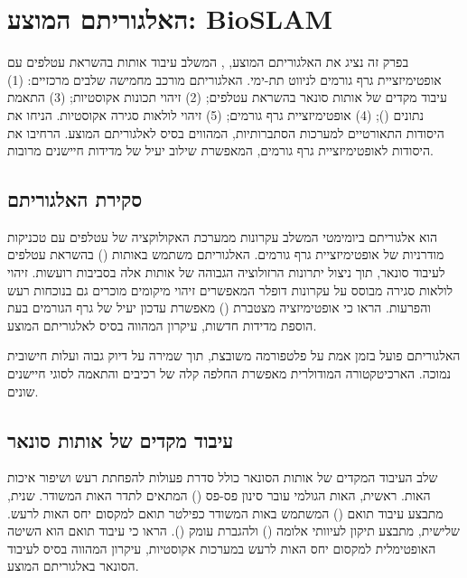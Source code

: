 
\section{האלגוריתם המוצע: BioSLAM}
\label{sec:proposed_algorithm}

בפרק זה נציג את האלגוריתם המוצע, , המשלב עיבוד אותות בהשראת עטלפים עם אופטימיזציית גרף גורמים לניווט תת-ימי. האלגוריתם מורכב מחמישה שלבים מרכזיים: (1) עיבוד מקדים של אותות סונאר בהשראת עטלפים; (2) זיהוי תכונות אקוסטיות; (3) התאמת נתונים (); (4) אופטימיזציית גרף גורמים; (5) זיהוי לולאות סגירה אקוסטיות. \citet{Thrun2005ProbRobotics} הניחו את היסודות התאורטיים למערכות  הסתברותיות, המהווים בסיס לאלגוריתם המוצע. \citet{Grisetti2010g2o} הרחיבו את היסודות לאופטימיזציית גרף גורמים, המאפשרת שילוב יעיל של מדידות חיישנים מרובות.

\subsection{סקירת האלגוריתם}
\label{sec:algorithm_overview}

 הוא אלגוריתם  ביומימטי המשלב עקרונות ממערכת האקולוקציה של עטלפים עם טכניקות מודרניות של אופטימיזציית גרף גורמים. האלגוריתם משתמש באותות  () בהשראת עטלפים לעיבוד סונאר, תוך ניצול יתרונות הרזולוציה הגבוהה של אותות אלה בסביבות רועשות. זיהוי לולאות סגירה מבוסס על עקרונות דופלר המאפשרים זיהוי מיקומים מוכרים גם בנוכחות רעש והפרעות. \citet{Kaess2012} הראו כי אופטימיזציה מצטברת () מאפשרת עדכון יעיל של גרף הגורמים בעת הוספת מדידות חדשות, עיקרון המהווה בסיס לאלגוריתם המוצע.

האלגוריתם פועל בזמן אמת על פלטפורמה משובצת, תוך שמירה על דיוק גבוה ועלות חישובית נמוכה. הארכיטקטורה המודולרית מאפשרת החלפה קלה של רכיבים והתאמה לסוגי חיישנים שונים.

\subsection{עיבוד מקדים של אותות סונאר}
\label{sec:sonar_preprocessing}

שלב העיבוד המקדים של אותות הסונאר כולל סדרת פעולות להפחתת רעש ושיפור איכות האות. ראשית, האות הגולמי עובר סינון פס-פס () המתאים לתדר האות המשודר. שנית, מתבצע עיבוד תואם () המשתמש באות המשודר כפילטר תואם למקסום יחס האות לרעש. שלישית, מתבצע תיקון לעיוותי אלומה () ולהגברת עומק (). \citet{Rihaczek1969MatchedFilter} הראו כי עיבוד תואם הוא השיטה האופטימלית למקסום יחס האות לרעש במערכות אקוסטיות, עיקרון המהווה בסיס לעיבוד הסונאר באלגוריתם המוצע.

